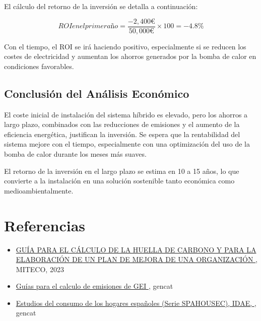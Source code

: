 \documentclass[a4paper,10pt,twocolumn]{article}
\begin{document}
\begin{Form}
	El cálculo del retorno de la inversión se detalla a continuación:

	\[
		{ROI en el primer año} = \frac{-2,400 €}{50,000 €} \times 100 = -4.8\%
	\]

	Con el tiempo, el ROI se irá haciendo positivo, especialmente si se reducen los costes de electricidad y aumentan los ahorros generados por la bomba de calor en condiciones favorables.

	\subsection{Conclusión del Análisis Económico}
	El coste inicial de instalación del sistema híbrido es elevado, pero los ahorros a largo plazo, combinados con las reducciones de emisiones y el aumento de la eficiencia energética, justifican la inversión. Se espera que la rentabilidad del sistema mejore con el tiempo, especialmente con una optimización del uso de la bomba de calor durante los meses más suaves.

	El retorno de la inversión en el largo plazo se estima en 10 a 15 años, lo que convierte a la instalación en una solución sostenible tanto económica como medioambientalmente.


	\section{Referencias}
	\begin{itemize}
		\item \href{
			      https://www.miteco.gob.es/content/dam/miteco/es/cambio-climatico/temas/mitigacion-politicas-y-medidas/guia_huella_carbono_tcm30-479093.pdf
		      }
		      {
			      GUÍA PARA EL CÁLCULO DE LA HUELLA DE CARBONO Y PARA LA ELABORACIÓN DE UN PLAN DE MEJORA DE UNA ORGANIZACIÓN
		      }
		      , MITECO, 2023
		\item \href{
			      https://canviclimatic.gencat.cat/es/actua/guia_de_calcul_demissions_de_co2/index.html
		      }
		      {
			      Guías para el calculo de emisiones de GEI
		      }
		      , gencat

		\item \href{
			      https://www.idae.es/informacion-y-publicaciones/estudios-informes-y-estadisticas/estudios-del-consumo-de-los-hogares-espanoles-serie-spahousec
		      }
		      {
			      Estudios del consumo de los hogares españoles (Serie SPAHOUSEC), IDAE,
		      }
		      , gencat

	\end{itemize}







	\TextField[name=I0 ,width=0cm]{}
	\TextField[name=Bt,width=0cm]{}






\end{Form}
\end{document}
